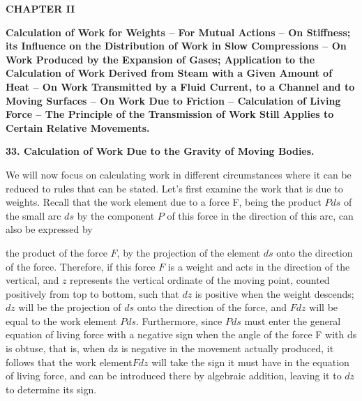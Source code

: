 \documentclass{book}
\begin{document}
\newpage
\begin{center}
\huge\bfseries CHAPTER II
\end{center}
\vspace{10mm} %


\textbf{Calculation of Work for Weights – For Mutual Actions – On Stiffness; its Influence on the Distribution of Work in Slow Compressions – On Work Produced by the Expansion of Gases; Application to the Calculation of Work Derived from Steam with a Given Amount of Heat – On Work Transmitted by a Fluid Current, to a Channel and to Moving Surfaces – On Work Due to Friction – Calculation of Living Force – The Principle of the Transmission of Work Still Applies to Certain Relative Movements.}
\vspace{4mm}

\vspace{4mm}
\textbf{33. Calculation of Work Due to the Gravity of Moving Bodies.}
\vspace{4mm} 


We will now focus on calculating work in different circumstances where it can be reduced to rules that can be stated.
Let's first examine the work that is due to weights.
Recall that the work element due to a force F, being the product \(Pds\) of the small arc \(ds\) by the component \(P\) of this force in the direction of this arc, can also be expressed by 

the product of the force \(F\), by the projection of the element \(ds\) onto the direction of the force. Therefore, if this force \(F\) is a weight and acts in the direction of the vertical, and \(z\) represents the vertical ordinate of the moving point, counted positively from top to bottom, such that \(dz\) is positive when the weight descends; \(dz\) will be the projection of \(ds\) onto the direction of the force, and \(Fdz\) will be equal to the work element 
 \(Pds\). Furthermore, since \(Pds\) must enter the general equation of living force with a negative sign when the angle of the force F with ds is obtuse, that is, when dz is negative in the movement actually produced, it follows that the work element\(Fdz\) will take the sign it must have in the equation of living force, and can be introduced there by algebraic addition, leaving it to \(dz\) to determine its sign.
\end{document}
